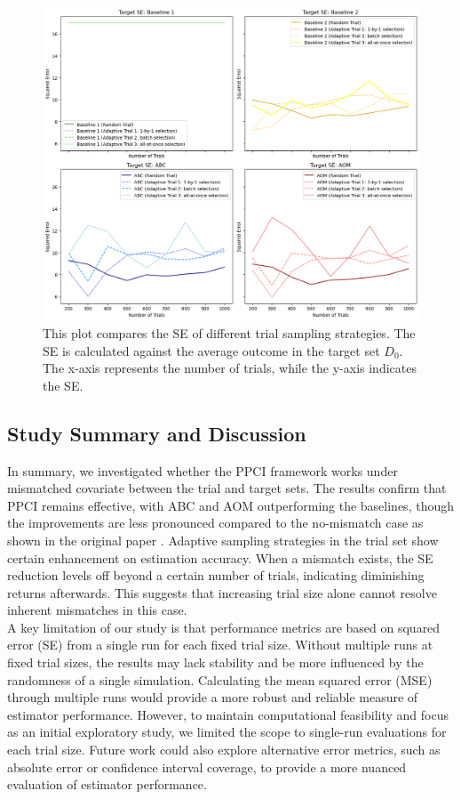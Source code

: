 \documentclass[12pt, oneside]{amsart}
\theoremstyle{definition}
\theoremstyle{remark}
\numberwithin{equation}{section}
\begin{document}
\begin{figure}[hbt!]
    \centering
    \includegraphics[scale=0.2]{Report/Figure/se_rct_target.jpg}
    \caption{This plot compares the SE of different trial sampling strategies. The SE is calculated against the average outcome in the target set $D_0$. The x-axis represents the number of trials, while the y-axis indicates the SE.}
    \label{se_rct_target}
\end{figure}
\FloatBarrier


\subsection{Study Summary and Discussion}
In summary, we investigated whether the PPCI framework works under mismatched covariate between the trial and target sets. The results confirm that PPCI remains effective, with ABC and AOM outperforming the baselines, though the improvements are less pronounced compared to the no-mismatch case as shown in the original paper \citep{qp}. Adaptive sampling strategies in the trial set show certain enhancement on estimation accuracy. When a mismatch exists, the SE reduction levels off beyond a certain number of trials, indicating diminishing returns afterwards. This suggests that increasing trial size alone cannot resolve inherent mismatches in this case.\\

A key limitation of our study is that performance metrics are based on squared error (SE) from a single run for each fixed trial size. Without multiple runs at fixed trial sizes, the results may lack stability and be more influenced by the randomness of a single simulation. Calculating the mean squared error (MSE) through multiple runs would provide a more robust and reliable measure of estimator performance. However, to maintain computational feasibility and focus as an initial exploratory study, we limited the scope to single-run evaluations for each trial size. Future work could also explore alternative error metrics, such as absolute error or confidence interval coverage, to provide a more nuanced evaluation of estimator performance. \\
\end{document}
